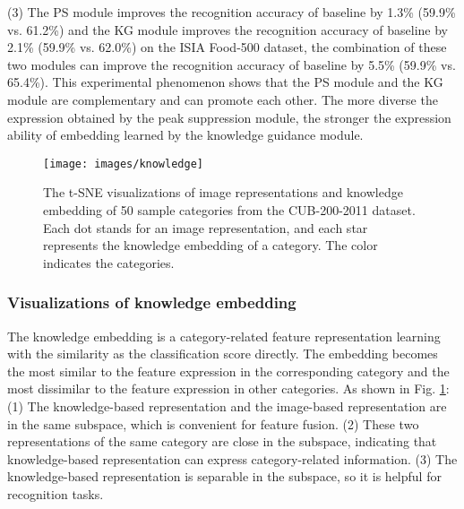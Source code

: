 \documentclass[5p,twocolumn]{elsarticle}
\begin{document}
(3) The PS module improves the recognition accuracy of baseline by 1.3\% (59.9\% vs. 61.2\%) and the KG module improves the recognition accuracy of baseline by 2.1\% (59.9\% vs. 62.0\%) on the ISIA Food-500 dataset, the combination of these two modules can improve the recognition accuracy of baseline by 5.5\% (59.9\% vs. 65.4\%). This experimental phenomenon shows that the PS module and the KG module are complementary and can promote each other. The more diverse the expression obtained by the peak suppression module, the stronger the expression ability of embedding learned by the knowledge guidance module. 


\begin{figure}[h]
\centering
 \texttt{[image: images/knowledge]}
  \caption{The t-SNE visualizations of image representations and knowledge embedding of 50 sample categories from the CUB-200-2011 dataset. Each dot stands for an image representation, and each star represents the knowledge embedding of a category. The color indicates the categories.}
  \label{fig:knowledge}
\end{figure}


\subsubsection{\textbf{Visualizations of knowledge embedding}}
The knowledge embedding is a category-related feature representation learning with the similarity as the classification score directly. The embedding becomes the most similar to the feature expression in the corresponding category and the most dissimilar to the feature expression in other categories. As shown in Fig. \ref{fig:knowledge}: (1) The knowledge-based representation and the image-based representation are in the same subspace, which is convenient for feature fusion. (2) These two representations of the same category are close in the subspace, indicating that knowledge-based representation can express category-related information. (3) The knowledge-based representation is separable in the subspace, so it is helpful for recognition tasks.
\end{document}

